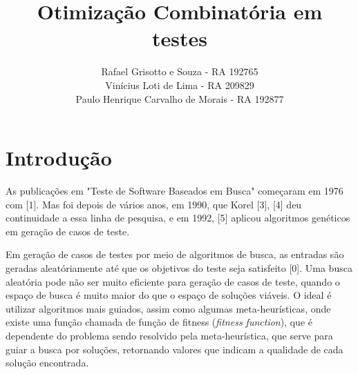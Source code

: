 \documentclass[12pt,a4paper]{article}
\title{Otimização Combinatória em  \\ testes}
\author{Rafael Grisotto e Souza - RA 192765\\ Vinícius Loti de Lima - RA 209829 \\ Paulo Henrique Carvalho de Morais - RA 192877}
\newtheorem{questao}{Questão}
\begin{document}
\maketitle

















\section{Introdução}

As publicações em "Teste de Software Baseados em Busca" começaram em 1976 com [1]. Mas foi depois de vários anos, em 1990, que Korel [3], [4] deu continuidade a essa linha de pesquisa, e em 1992, [5] aplicou algoritmos genéticos em geração de casos de teste. 

Em geração de casos de testes por meio de algoritmos de busca, as entradas são geradas aleatóriamente até que os objetivos do teste seja satisfeito [0]. Uma busca aleatória pode não ser muito eficiente para geração de casos de teste, quando o espaço de busca é muito maior do que o espaço de soluções viáveis. O ideal é utilizar algoritmos mais guiados, assim como algumas meta-heurísticas, onde existe uma função chamada de função de fitness (\emph{fitness function}), que é dependente do problema sendo resolvido pela meta-heurística, que serve para guiar a busca por soluções, retornando valores que indicam a qualidade de cada solução encontrada. 
\end{document}
